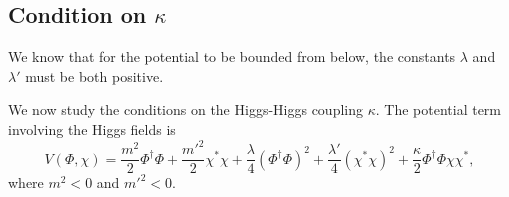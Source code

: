 \subsection{Condition on $\kappa$}

We know that for the potential to be bounded from below, the constants $\lambda$ and $\lambda'$ must be both positive.

We now study the conditions on the Higgs-Higgs coupling $\kappa$. The potential term involving the Higgs fields is
\begin{equation}
V(\Phi,\chi) = \frac{m^2}{2}\Phi^{\dagger}\Phi+\frac{m'^2}{2}\chi^{*}\chi+\frac{\lambda}{4}(\Phi^{\dagger}\Phi)^2+\frac{\lambda'}{4}(\chi^{*}\chi)^2+\frac{\kappa}{2}\Phi^{\dagger}\Phi\chi\chi^*,
\end{equation}
where $m^2<0$ and $m'^2<0$.

